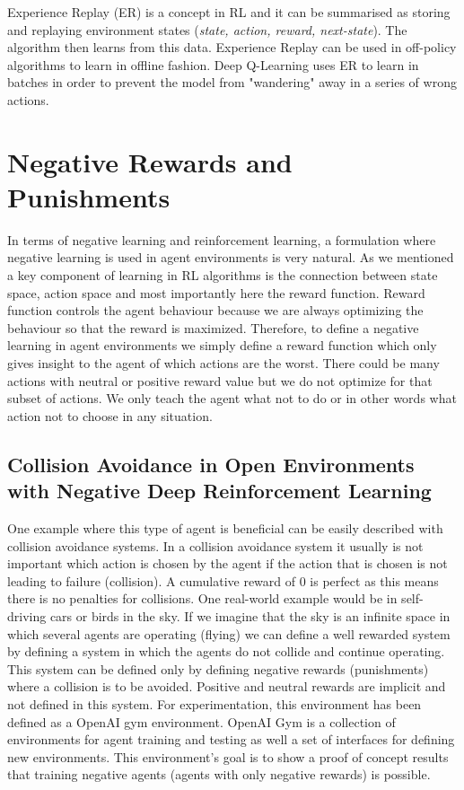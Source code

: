 \documentclass[b5paper]{book}
\begin{document}
Experience Replay (ER) is a concept in RL and it can be summarised as storing and replaying environment states (\emph{state, action, reward, next-state}). The algorithm then learns from this data. Experience Replay can be used in off-policy algorithms to learn in offline fashion. Deep Q-Learning uses ER to learn in batches in order to prevent the model from "wandering" away in a series of wrong actions.

\section{Negative Rewards and Punishments}

In terms of negative learning and reinforcement learning, a formulation where negative learning is used in agent environments is very natural. As we mentioned a key component of learning in RL algorithms is the connection between state space, action space and most importantly here the reward function. Reward function controls the agent behaviour because we are always optimizing the behaviour so that the reward is maximized. Therefore, to define a negative learning in agent environments we simply define a reward function which only gives insight to the agent of which actions are the worst. There could be many actions with neutral or positive reward value but we do not optimize for that subset of actions. We only teach the agent what not to do or in other words what action not to choose in any situation.

\subsection{Collision Avoidance in Open Environments with Negative Deep Reinforcement Learning}

One example where this type of agent is beneficial can be easily described with collision avoidance systems. In a collision avoidance system it usually is not important which action is chosen by the agent if the action that is chosen is not leading to failure (collision). A cumulative reward of 0 is perfect as this means there is no penalties for collisions. One real-world example would be in self-driving cars or birds in the sky. If we imagine that the sky is an infinite space in which several agents are operating (flying) we can define a well rewarded system by defining a system in which the agents do not collide and continue operating. This system can be defined only by defining negative rewards (punishments) where a collision is to be avoided. Positive and neutral rewards are implicit and not defined in this system. For experimentation, this environment has been defined as a OpenAI gym environment. OpenAI Gym is a collection of environments for agent training and testing as well a set of interfaces for defining new environments. This environment's goal is to show a proof of concept results that training negative agents (agents with only negative rewards) is possible.
\end{document}
